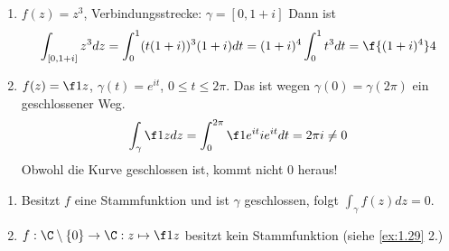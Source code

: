 \documentclass[a4paper,10pt]{scrartcl}
\begin{document}
\begin{ex}
	\begin{enumerate}[1)]
		\item 
			$f(z)=z^3$, Verbindungsstrecke: $\gamma=[0,1+i]$
			Dann ist
			\[
				\int_{[0,1+i]}z^3 dz = \int_0^1(t(1+i))^3(1+i) dt = (1+i)^4 \int_0^1 t^3 dt = \f {(1+i)^4}4
			\]
		\item
			$f(z)=\f 1z$, $\gamma(t)=e^{it}$, $0\le t\le 2\pi$.
			Das ist wegen $\gamma(0)=\gamma(2\pi)$ ein geschlossener Weg.
			\[
				\int_\gamma \f 1z dz = \int_0^{2\pi}\f 1{e^{it}} ie^{it} dt = 2\pi i \neq 0 
			\]
			Obwohl die Kurve geschlossen ist, kommt nicht $0$ heraus!
	\end{enumerate}
\end{ex}


\begin{prop}
	\label{prop:1.31}
	\begin{enumerate}[1)]
		\item 
			Besitzt $f$ eine Stammfunktion und ist $\gamma$ geschlossen, folgt $\int_\gamma f(z)dz = 0$.
		\item
			$f:\C\setminus \{0\} \to \C : z\mapsto \f 1z$ besitzt kein Stammfunktion (siehe \ref{ex:1.29} 2.)
	\end{enumerate}
\end{prop}
\end{document}
